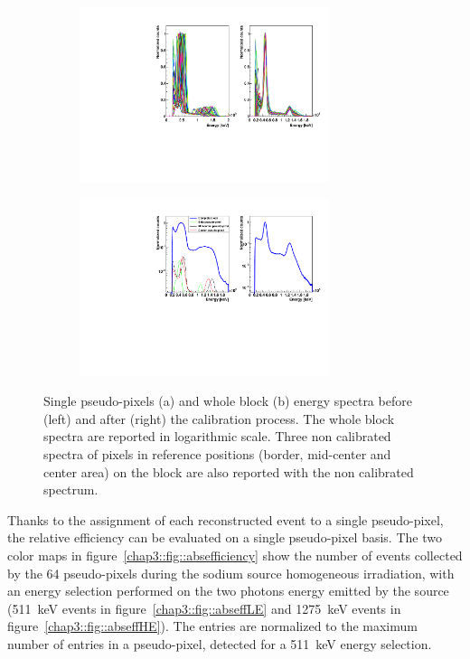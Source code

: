 \begin{figure}
\begin{subfigure}[t]{1\textwidth}
\centering
\includegraphics[width=0.8\textwidth]{03_GraphicFiles/chapter3_CLaRySproto/Absorber/images/EspectraOverlap_noAngles.pdf}
\caption{}
\label{chap3::fig::abssinglePixCal}
\end{subfigure}
\begin{subfigure}[t]{1\textwidth}
\centering
\includegraphics[width=0.8\textwidth]{03_GraphicFiles/chapter3_CLaRySproto/Absorber/images/Espectra_withSingles.pdf}
\caption{}
\label{chap3::fig::absEspectrumCal}
\end{subfigure}
\caption{Single pseudo-pixels (a) and whole block (b) energy spectra before (left) and after (right) the calibration process. The whole block spectra are reported in logarithmic scale. Three non calibrated spectra of pixels in reference positions (border, mid-center and center area) on the block are also reported with the non calibrated spectrum.}
\label{chap3::fig::abspixCal_analysis}
\end{figure}

Thanks to the assignment of each reconstructed event to a single pseudo-pixel, the relative efficiency can be evaluated on a single pseudo-pixel basis. The two color maps in figure~\ref{chap3::fig::absefficiency} show the number of events collected by the 64 pseudo-pixels during the sodium source homogeneous irradiation, with an energy selection performed on the two photons energy emitted by the source (511~keV events in figure~\ref{chap3::fig::abseffLE} and 1275~keV events in figure~\ref{chap3::fig::abseffHE}). The entries are normalized to the maximum number of entries in a pseudo-pixel, detected for a 511~keV energy selection.

